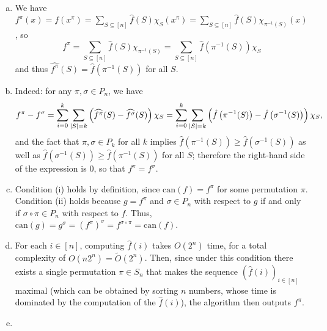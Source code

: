 \documentclass[12pt]{article}
\newcommand{\eqn}[1]{\begin{equation*}#1\end{equation*}}
\newcommand{\sumS}{\sum_{S \subseteq [n]}}
\begin{document}
\subsection{}
\begin{enumerate}[(a)]
    \item We have $f^\pi(x) = f(x^\pi) = \sumS \hat{f}(S) \chi_S(x^\pi) = \sumS \hat{f}(S) \chi_{\pi^{-1}(S)}(x)$, so
    \eqn{f^\pi = \sumS \hat{f}(S) \chi_{\pi^{-1}(S)} = \sumS \hat{f}\left(\pi^{-1}(S)\right) \chi_S}
    and thus $\widehat{f^\pi}(S) = \hat{f}(\pi^{-1}(S))$ for all $S$.
    
    \item Indeed: for any $\pi, \sigma \in P_n$, we have
    \eqn{f^\pi - f^\sigma = \sum_{i = 0}^k \sum_{\abs{S} = k} \left(\widehat{f^\pi}(S) - \widehat{f^\sigma}(S)\right)\chi_S = \sum_{i = 0}^k \sum_{\abs{S} = k} \left(\hat{f}\left(\pi^{-1}(S)\right) - \hat{f}\left(\sigma^{-1}(S)\right)\right)\chi_S,}
    and the fact that $\pi, \sigma \in P_k$ for all $k$ implies $\hat{f}\left(\pi^{-1}(S)\right) \geq \hat{f}\left(\sigma^{-1}(S)\right)$ as well as $\hat{f}\left(\sigma^{-1}(S)\right) \geq \hat{f}\left(\pi^{-1}(S)\right)$ for all $S$; therefore the right-hand side of the expression is 0, so that $f^\pi = f^\sigma$.
    
    \item Condition (i) holds by definition, since $\text{can}(f) = f^\pi$ for some permutation $\pi$. Condition (ii) holds because $g = f^\pi$ and $\sigma \in P_n$ with respect to $g$ if and only if $\sigma \circ \pi \in P_n$ with respect to $f$. Thus, $\text{can}(g) = g^\sigma = \left(f^\pi\right)^\sigma = f^{\sigma \circ \pi} = \text{can}(f)$.
    
    \item For each $i \in [n]$, computing $\hat{f}(i)$ takes $O(2^n)$ time, for a total complexity of $O(n 2^n) = \tilde{O}(2^n)$. Then, since under this condition there exists a single permutation $\pi \in S_n$ that makes the sequence $\left(\hat{f}(i)\right)_{i \in [n]}$ maximal (which can be obtained by sorting $n$ numbers, whose time is dominated by the computation of the $\hat{f}(i)$), the algorithm then outputs $f^\pi$.
    
    \item
\end{enumerate}

\subsection{}

\subsection{}

\subsection{}

\subsection{}

\subsection{}
\end{document}
